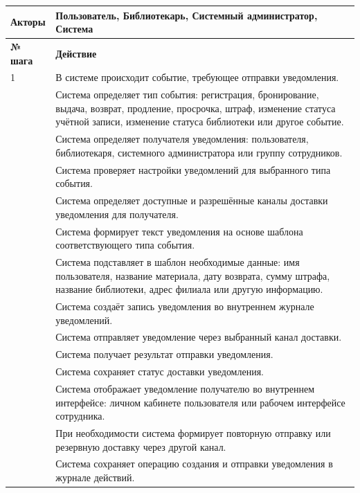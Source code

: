 \documentclass[12pt,a4paper]{article}
\begin{document}
\begin{xltabular}{\textwidth}{
				|>{\raggedright\arraybackslash}p{2.7cm}
				|>{\raggedright\arraybackslash}X|
			}
			\textbf{Акторы} &
			Пользователь, Библиотекарь, Системный администратор, Система \\
			\hline
			
			
			\textbf{№ шага} & \textbf{Действие} \\
			\hline
			
			1 & В системе происходит событие, требующее отправки уведомления. \\
			 & Система определяет тип события: регистрация, бронирование, выдача,
			возврат, продление, просрочка, штраф, изменение статуса учётной
			записи, изменение статуса библиотеки или другое событие. \\
			 & Система определяет получателя уведомления: пользователя,
			библиотекаря, системного администратора или группу сотрудников. \\
			 & Система проверяет настройки уведомлений для выбранного типа события. \\
			 & Система определяет доступные и разрешённые каналы доставки
			уведомления для получателя. \\
			 & Система формирует текст уведомления на основе шаблона
			соответствующего типа события. \\
			 & Система подставляет в шаблон необходимые данные: имя пользователя,
			название материала, дату возврата, сумму штрафа, название библиотеки,
			адрес филиала или другую информацию. \\
			 & Система создаёт запись уведомления во внутреннем журнале уведомлений. \\
			 & Система отправляет уведомление через выбранный канал доставки. \\
			 & Система получает результат отправки уведомления. \\
			 & Система сохраняет статус доставки уведомления. \\
			 & Система отображает уведомление получателю во внутреннем интерфейсе:
			личном кабинете пользователя или рабочем интерфейсе сотрудника. \\
			 & При необходимости система формирует повторную отправку или
			резервную доставку через другой канал. \\
			 & Система сохраняет операцию создания и отправки уведомления в
			журнале действий. \\
			\hline
			

\end{xltabular}
\end{document}
